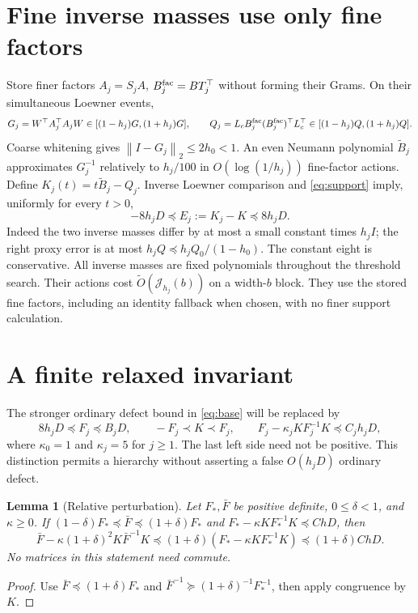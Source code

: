 \documentclass[11pt]{article}
\newtheorem{lemma}[theorem]{Lemma}
\newcommand{\norm}[1]{\left\lVert#1\right\rVert}
\newcommand{\tO}{\widetilde O}
\newcommand{\Jc}{\mathcal J}
\begin{document}
\section{Fine inverse masses use only fine factors}
Store finer factors \(A_j=S_jA\), \(B_j^{\rm fac}=BT_j^\top\)
without forming their Grams. On their simultaneous Loewner events,
\[
 G_j=W^\top A_j^\top A_jW\in[(1-h_j)G,(1+h_j)G],\qquad
 Q_j=L_cB_j^{\rm fac}(B_j^{\rm fac})^\top L_c^\top
                         \in[(1-h_j)Q,(1+h_j)Q].
\]
Coarse whitening gives \(\norm{I-G_j}_2\leq2h_0<1\).
An even Neumann polynomial \(\widetilde B_j\) approximates
\(G_j^{-1}\) relatively to \(h_j/100\) in
\(O(\log(1/h_j))\) fine-factor actions. Define
\(K_j(t)=t\widetilde B_j-Q_j\). Inverse Loewner comparison and
\eqref{eq:support} imply, uniformly for every \(t>0\),
\begin{equation}\label{eq:proxy}
 -8h_jD\preceq E_j:=K_j-K\preceq8h_jD.
\end{equation}
Indeed the two inverse masses differ by at most a small constant times
\(h_jI\); the right proxy error is at most
\(h_jQ\preceq h_jQ_0/(1-h_0)\). The constant eight is conservative.
All inverse masses are fixed polynomials throughout the threshold search.
Their actions cost \(\tO(\Jc_{h_j}(b))\) on a width-\(b\) block.
They use the stored fine factors, including an identity fallback when
chosen, with no finer support calculation.

\section{A finite relaxed invariant}
The stronger ordinary defect bound in \eqref{eq:base} will be replaced
by
\begin{equation}\label{eq:invariant}
 8h_jD\preceq F_j\preceq B_jD,\qquad -F_j\prec K\prec F_j,
 \qquad F_j-\kappa_jKF_j^{-1}K\preceq C_jh_jD,
\end{equation}
where \(\kappa_0=1\) and \(\kappa_j=5\) for \(j\geq1\).
The last left side need not be positive. This distinction permits a
hierarchy without asserting a false \(O(h_jD)\) ordinary defect.

\begin{lemma}[Relative perturbation]\label{lem:relative}
Let \(F_*,\bar F\) be positive definite, \(0\leq\delta<1\), and \(\kappa\geq0\).
If \((1-\delta)F_*\preceq\bar F\preceq(1+\delta)F_*\) and
\(F_*-\kappa KF_*^{-1}K\preceq ChD\), then
\[
 \bar F-\kappa(1+\delta)^2K\bar F^{-1}K
 \preceq(1+\delta)(F_*-\kappa KF_*^{-1}K)
 \preceq(1+\delta)ChD.
\]
No matrices in this statement need commute.
\end{lemma}
\begin{proof}
Use \(\bar F\preceq(1+\delta)F_*\) and
\(\bar F^{-1}\succeq(1+\delta)^{-1}F_*^{-1}\), then apply
congruence by \(K\).
\end{proof}
\end{document}
